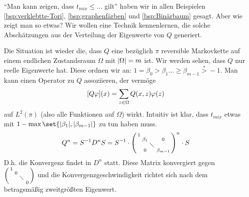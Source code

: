  \enquote{Man kann zeigen, dass $t_{mix} \leq \dots$ gilt} haben wir in allen Beispielen \ref{bsp:verklebtte-Tori}, \ref{bsp:graphenfärben} und \ref{bsp:Binärbaum} gesagt. Aber wie zeigt man so etwas? Wir wollen eine Technik kennenlernen, die solche Abschätzungen aus der Verteilung der Eigenwerte von $Q$ generiert. 
 
 Die Situation ist wieder die, dass $Q$ eine bezüglich $\pi$ reversible Markovkette auf einem endlichen Zustandsraum $\Omega$ mit $\lvert\Omega\rvert = m$ ist. Wir werden sehen, dass $Q$ nur reelle Eigenwerte hat. Diese ordnen wir an: $1 = \beta_0 > \beta_1 \dots \geq \beta_{m-1} \overset{*}{>} -1$. Man kann einen Operator zu $Q$ assoziieren, der vermöge
 \begin{align}
 	\benb{Q\phi}(x) = \sum\limits_{z \in \Omega} Q(x,z)\phi(z)
 \end{align}
 auf $L^2(\pi)$ (also alle Funktionen auf $\Omega$) wirkt. Intuitiv ist klar, dass $t_{mix}$ etwas mit $1 - \max\set{\abs{\beta_1},\abs{\beta_{m-1}}}$ zu tun haben muss. 
 	\begin{align}
 		Q^n = S^{-1} D^n S = S^{-1} \cdot 
 		\begin{psmallmatrix}
	 		1	&	&	&	 \\
	 			&\beta_1	&	&0	 \\
	 			&	& \diagdown	&	 \\
	 			&	0 & 	& \beta_{m-1}
 		\end{psmallmatrix}^n \cdot S
  	\end{align}
  	D.h. die Konvergenz findet in $D^n$ statt. Diese Matrix konvergiert gegen $\begin{psmallmatrix}
  	1 & & & \\
  	& 0 & & \\
  	& & \diagdown & \\
  	& & & 0
  	\end{psmallmatrix}$ und die Konvergenzgeschwindigkeit richtet sich nach dem betragsmäßig zweitgrößten Eigenwert.
  	
